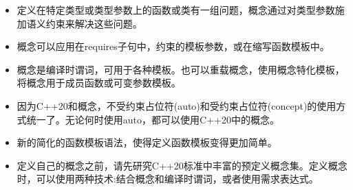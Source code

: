 \begin{tcolorbox}[breakable,enhanced jigsaw,colback=mygreen!5!white,colframe=mygreen!75!black,title={总结}]
\begin{itemize}
\item
定义在特定类型或类型参数上的函数或类有一组问题，概念通过对类型参数施加语义约束来解决这些问题。

\item
概念可以应用在requires子句中，约束的模板参数，或在缩写函数模板中。

\item
概念是编译时谓词，可用于各种模板。也可以重载概念，使用概念特化模板，将概念用于成员函数或可变参数模板。

\item
因为C++20和概念，不受约束占位符(auto)和受约束占位符(concept)的使用方式统一了。无论何时使用auto，都可以使用C++20中的概念。

\item
新的简化的函数模板语法，使得定义函数模板变得更加简单。

\item
定义自己的概念之前，请先研究C++20标准中丰富的预定义概念集。定义概念时，可以使用两种技术:结合概念和编译时谓词，或者使用需求表达式。
\end{itemize}
\end{tcolorbox}

\newpage


















